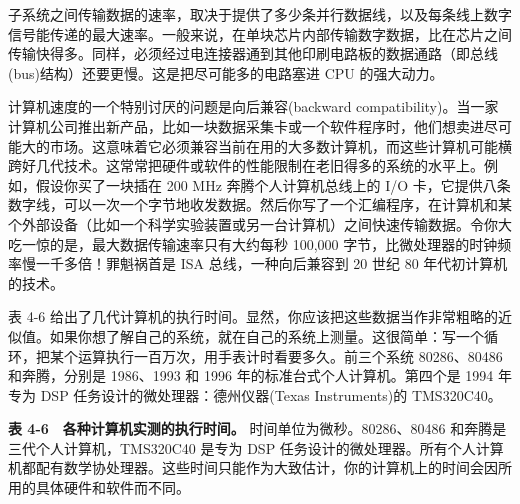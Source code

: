 子系统之间传输数据的速率，取决于提供了多少条并行数据线，以及每条线上数字信号能传递的最大速率。一般来说，在单块芯片内部传输数字数据，比在芯片之间传输快得多。同样，必须经过电连接器通到其他印刷电路板的数据通路（即总线(bus)结构）还要更慢。这是把尽可能多的电路塞进
CPU 的强大动力。

计算机速度的一个特别讨厌的问题是向后兼容(backward
compatibility)。当一家计算机公司推出新产品，比如一块数据采集卡或一个软件程序时，他们想卖进尽可能大的市场。这意味着它必须兼容当前在用的大多数计算机，而这些计算机可能横跨好几代技术。这常常把硬件或软件的性能限制在老旧得多的系统的水平上。例如，假设你买了一块插在
200 MHz 奔腾个人计算机总线上的 I/O
卡，它提供八条数字线，可以一次一个字节地收发数据。然后你写了一个汇编程序，在计算机和某个外部设备（比如一个科学实验装置或另一台计算机）之间快速传输数据。令你大吃一惊的是，最大数据传输速率只有大约每秒
100,000 字节，比微处理器的时钟频率慢一千多倍！罪魁祸首是 ISA
总线，一种向后兼容到 20 世纪 80 年代初计算机的技术。

表 4-6
给出了几代计算机的执行时间。显然，你应该把这些数据当作非常粗略的近似值。如果你想了解自己的系统，就在自己的系统上测量。这很简单：写一个循环，把某个运算执行一百万次，用手表计时看要多久。前三个系统
80286、80486 和奔腾，分别是 1986、1993 和 1996
年的标准台式个人计算机。第四个是 1994 年专为 DSP
任务设计的微处理器：德州仪器(Texas Instruments)的 TMS320C40。

\textbf{表 4-6　各种计算机实测的执行时间。} 时间单位为微秒。80286、80486
和奔腾是三代个人计算机，TMS320C40 是专为 DSP
任务设计的微处理器。所有个人计算机都配有数学协处理器。这些时间只能作为大致估计，你的计算机上的时间会因所用的具体硬件和软件而不同。

